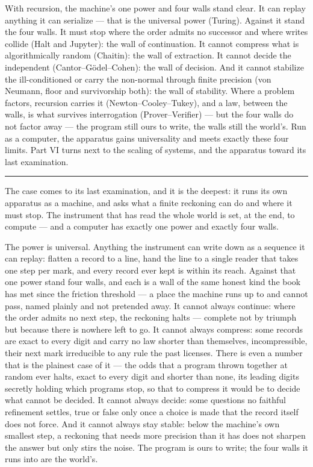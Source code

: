 With recursion, the machine's one power and four walls stand clear. It can
replay anything it can serialize --- that is the universal power (Turing). Against it stand the four walls. It
must stop where the order admits no successor and where writes collide (Halt and Jupyter): the wall of
continuation. It cannot compress what is algorithmically random (Chaitin): the wall of extraction. It cannot
decide the independent (Cantor--G\"odel--Cohen): the wall of decision. And it cannot stabilize the
ill-conditioned or carry the non-normal through finite precision (von Neumann, floor and survivorship both):
the wall of stability. Where a problem factors, recursion carries it (Newton--Cooley--Tukey), and a law,
between the walls, is what survives interrogation (Prover--Verifier) --- but the four walls do not factor away
--- the program still ours to write, the walls still the world's.
Run as a computer, the apparatus gains universality and meets exactly these four limits. Part VI turns next to
the scaling of systems, and the apparatus toward its last examination.

\bigskip
\begin{center}
\rule{0.4\textwidth}{0.4pt}
\end{center}
\bigskip

\noindent The case comes to its last examination, and it is the deepest: it runs its own apparatus as a machine,
and asks what a finite reckoning can do and where it must stop. The instrument that has read the whole world is
set, at the end, to compute --- and a computer has exactly one power and exactly four walls.

The power is universal. Anything the instrument can write down as a sequence it can replay: flatten a record to
a line, hand the line to a single reader that takes one step per mark, and every record ever kept is within its
reach. Against that one power stand four walls, and each is a wall of the same honest kind the book has met
since the friction threshold --- a place the machine runs up to and cannot pass, named plainly and not
pretended away. It cannot always continue: where the order admits no next step, the reckoning halts --- complete
not by triumph but because there is nowhere left to go. It cannot always compress: some records are exact to
every digit and carry no law shorter than themselves, incompressible, their next mark irreducible to any rule
the past licenses. There is even a number that is the plainest case of it --- the odds that a program thrown
together at random ever halts, exact to every digit and shorter than none, its leading digits secretly holding
which programs stop, so that to compress it would be to decide what cannot be decided. It cannot always decide: some questions no faithful refinement settles, true or false only
once a choice is made that the record itself does not force. And it cannot always stay stable: below the
machine's own smallest step, a reckoning that needs more precision than it has does not sharpen the answer but
only stirs the noise. The program is ours to write; the four walls it runs into are the world's.

